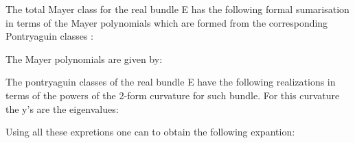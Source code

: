 \documentclass[a4paper,a4paper]{article}
\begin{document}
The total Mayer class for the real bundle E has the following formal sumarisation in terms of the Mayer polynomials which are formed from the corresponding Pontryaguin classes :
\begin{center}
{  \coordHE{} }
\end{center}
The Mayer polynomials are given by:
\begin{center}
{  \coordHE{} }
\end{center}
\begin{center}
{  \coordHE{} }
\end{center}
\begin{center}
{  \coordHE{} }
\end{center}
\begin{center}
{  \coordHE{} }
\end{center}
The pontryaguin classes of the real bundle E have the following realizations in terms of the powers of the 2-form curvature for such bundle.  For this curvature  the y's are the eigenvalues:
\begin{center}
{  \coordHE{} }
\end{center}
\begin{center}
{  \coordHE{} }
\end{center}
\begin{center}
{  \coordHE{} }
\end{center}
Using all these expretions one can to obtain the following expantion:
\begin{center}
\setlength{\baselineskip}{30pt} 
{  \coordHE{} }
\end{center}
\end{document}
